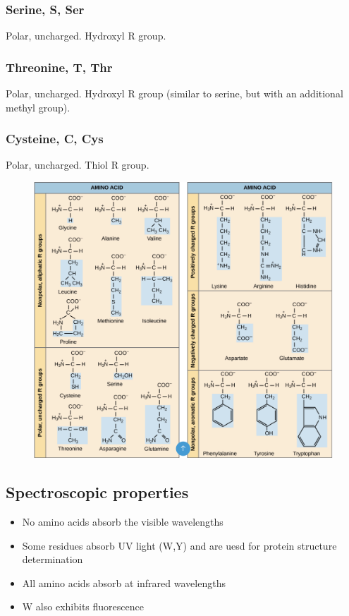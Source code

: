 \documentclass[letterpaper, 12pt]{article}
\begin{document}
\subsubsection*{Serine, S, Ser}
Polar, uncharged. Hydroxyl R group.

\subsubsection*{Threonine, T, Thr}
Polar, uncharged. Hydroxyl R group (similar to serine, but with an additional methyl group).

\subsubsection*{Cysteine, C, Cys}
Polar, uncharged. Thiol R group.

\begin{figure}[H]
\centering
\includegraphics[width=\textwidth]{aas_forreal}
\end{figure}

\subsection*{Spectroscopic properties}

\begin{itemize}
\item No amino acids absorb the visible wavelengths
\item Some residues absorb UV light (W,Y) and are uesd for protein structure determination
\item All amino acids absorb at infrared wavelengths
\item W also exhibits fluorescence
\end{itemize}
\end{document}

